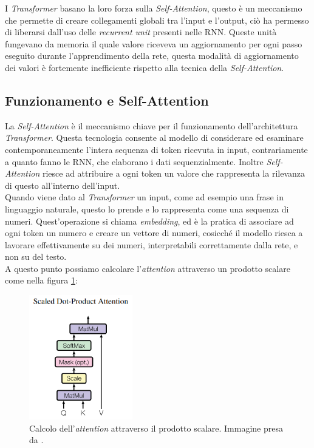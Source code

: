 I \emph{Transformer} basano la loro forza sulla \emph{Self-Attention}, questo \`e un meccanismo che permette di creare collegamenti globali tra l'input e l'output, ci\`o ha permesso di liberarsi dall'uso delle \emph{recurrent unit} presenti nelle RNN. Queste unit\`a fungevano da memoria il quale valore riceveva un aggiornamento per ogni passo eseguito durante l'apprendimento della rete, questa modalit\`a di aggiornamento dei valori \`e fortemente inefficiente rispetto alla tecnica della \emph{Self-Attention}.

\subsection{Funzionamento e Self-Attention}
La \emph{Self-Attention} \`e il meccanismo chiave per il funzionamento dell'architettura \emph{Transformer}. Questa tecnologia consente al modello di considerare ed esaminare contemporaneamente l'intera sequenza di token ricevuta in input, contrariamente a quanto fanno le RNN, che elaborano i dati sequenzialmente.
Inoltre \emph{Self-Attention} riesce ad attribuire a ogni token un valore che rappresenta la rilevanza di questo all'interno dell'input.\\
Quando viene dato al \emph{Transformer} un input, come ad esempio una frase in linguaggio naturale, questo lo prende e lo rappresenta come una sequenza di numeri. Quest'operazione si chiama \emph{embedding}, ed \`e la pratica di associare ad ogni token un numero e creare un vettore di numeri, cosicch\'e il modello riesca a lavorare effettivamente su dei numeri, interpretabili correttamente dalla rete, e non su del testo.\\
A questo punto possiamo calcolare l'\emph{attention} attraverso un prodotto scalare come nella figura \ref{fig:scaledDotProductAttention}:
\begin{figure}[H]
    \centering
    \includegraphics[width=0.4\textwidth]{media/1-introduzioneLLM/scaledDotProductAttention.png}
    \caption{Calcolo dell'\emph{attention} attraverso il prodotto scalare. Immagine presa da \cite{vaswani2023attentionneed}.}
    \label{fig:scaledDotProductAttention}
\end{figure}

